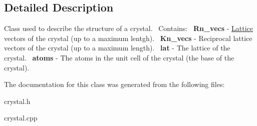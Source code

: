 \subsection{Detailed Description}
Class used to describe the structure of a crystal.~\newline
Contains\+:~\newline
{\bfseries Rn\+\_\+vecs} -\/ \hyperlink{classLattice}{Lattice} vectors of the crystal (up to a maximum lentgh).~\newline
{\bfseries Kn\+\_\+vecs} -\/ Reciprocal lattice vectors of the crystal (up to a maximum length).~\newline
{\bfseries lat} -\/ The lattice of the crystal.~\newline
{\bfseries atoms} -\/ The atoms in the unit cell of the crystal (the base of the crystal).~\newline


The documentation for this class was generated from the following files\+:\begin{DoxyCompactItemize}
\item 
crystal.\+h\item 
crystal.\+cpp\end{DoxyCompactItemize}
